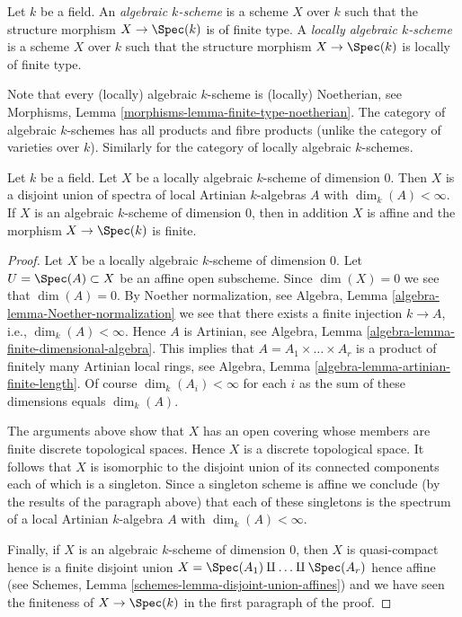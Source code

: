 \begin{definition}
\label{definition-algebraic-scheme}
Let $k$ be a field. An {\it algebraic $k$-scheme} is a scheme $X$ over $k$
such that the structure morphism $X \to \Spec(k)$ is of
finite type. A {\it locally algebraic $k$-scheme} is a scheme $X$ over $k$
such that the structure morphism $X \to \Spec(k)$ is
locally of finite type.
\end{definition}

\noindent
Note that every (locally) algebraic $k$-scheme is (locally) Noetherian, see
Morphisms, Lemma \ref{morphisms-lemma-finite-type-noetherian}.
The category of algebraic $k$-schemes has all products and fibre products
(unlike the category of varieties over $k$). Similarly for the category
of locally algebraic $k$-schemes.

\begin{lemma}
\label{lemma-algebraic-scheme-dim-0}
Let $k$ be a field. Let $X$ be a locally algebraic $k$-scheme of
dimension $0$. Then $X$ is a disjoint union of spectra of local Artinian
$k$-algebras $A$ with $\dim_k(A) < \infty$. If $X$ is an algebraic $k$-scheme
of dimension $0$, then in addition $X$ is affine and the morphism
$X \to \Spec(k)$ is finite.
\end{lemma}

\begin{proof}
Let $X$ be a locally algebraic $k$-scheme of dimension $0$.
Let $U = \Spec(A) \subset X$ be an affine open subscheme.
Since $\dim(X) = 0$ we see that $\dim(A) = 0$.
By Noether normalization, see
Algebra, Lemma \ref{algebra-lemma-Noether-normalization}
we see that there exists a finite injection $k \to A$, i.e.,
$\dim_k(A) < \infty$. Hence $A$ is Artinian, see
Algebra, Lemma \ref{algebra-lemma-finite-dimensional-algebra}.
This implies that $A = A_1 \times \ldots \times A_r$ is a product
of finitely many Artinian local rings, see
Algebra, Lemma \ref{algebra-lemma-artinian-finite-length}.
Of course $\dim_k(A_i) < \infty$ for each $i$ as the sum of
these dimensions equals $\dim_k(A)$.

\medskip\noindent
The arguments above show that $X$ has an open covering whose members are
finite discrete topological spaces. Hence $X$ is a discrete topological space.
It follows that $X$ is isomorphic to the disjoint union of its connected
components each of which is a singleton. Since a singleton scheme is affine
we conclude (by the results of the paragraph above) that each of these
singletons is the spectrum of a local Artinian $k$-algebra $A$ with
$\dim_k(A) < \infty$.

\medskip\noindent
Finally, if $X$ is an algebraic $k$-scheme of dimension $0$, then
$X$ is quasi-compact hence is a finite disjoint union
$X = \Spec(A_1) \amalg \ldots \amalg \Spec(A_r)$
hence affine (see
Schemes, Lemma \ref{schemes-lemma-disjoint-union-affines})
and we have seen the finiteness of $X \to \Spec(k)$ in the
first paragraph of the proof.
\end{proof}

